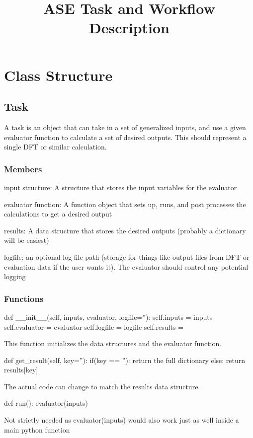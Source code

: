 \documentclass [notitlepage, 12pt, a4paper]{article}
\begin{document}
\title{ASE Task and Workflow Description}

\section{Class Structure}

\subsection{Task}
A task is an object that can take in a set of generalized inputs, and use a given evaluator function to calculate a set of desired outputs.
This should represent a single DFT or similar calculation.

\subsubsection{Members}
input structure: A structure that stores the input variables for the evaluator

evaluator function: A function object that sets up, runs, and post processes the calculations to get a desired output

results: A data structure that stores the desired outputs (probably a dictionary will be easiest)

logfile: an optional log file path (storage for things like output files from DFT or evaluation data if the user wants it). The evaluator should control any potential logging

\subsubsection{Functions}
\begin{python}
def __init__(self, inputs, evaluator, logfile=''):
    self.inputs = inputs
    self.evaluator = evaluator
    self.logfile = logfile
    self.results = {}
\end{python}
This function initializes the data structures and the evaluator function.

\begin{python}
def get_result(self, key=''):
    if(key == ''):
        return the full dictionary
    else:
        return results[key]
\end{python}
The actual code can change to match the results data structure.

\begin{python}
def run():
    evaluator(inputs)
\end{python}
Not strictly needed as evaluator(inputs) would also work just as well inside a main python function
\end{document}
